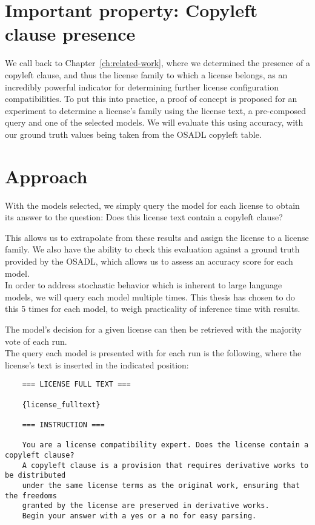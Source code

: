 \section{Important property: Copyleft clause presence}

We call back to Chapter~\ref{ch:related-work}, where we determined the presence of a copyleft clause, and thus the license family to which a license belongs, as an incredibly powerful indicator for determining further license configuration compatibilities. To put this into practice, a proof of concept is proposed for an experiment to determine a license's family using the license text, a pre-composed query and one of the selected models. We will evaluate this using accuracy, with our ground truth values being taken from the OSADL copyleft table.

\section{Approach}

With the models selected, we simply query the model for each license to obtain its answer to the question: Does this license text contain a copyleft clause?

This allows us to extrapolate from these results and assign the license to a license family. We also have the ability to check this evaluation against a ground truth provided by the OSADL, which allows us to assess an accuracy score for each model. \\

In order to address stochastic behavior which is inherent to large language models, we will query each model multiple times. This thesis has chosen to do this 5 times for each model, to weigh practicality of inference time with results.

The model's decision for a given license can then be retrieved with the majority vote of each run. \\

The query each model is presented with for each run is the following, where the license's text is inserted in the indicated position:

\begin{verbatim}
	=== LICENSE FULL TEXT ===
	
	{license_fulltext}
	
	=== INSTRUCTION ===
	
	You are a license compatibility expert. Does the license contain a copyleft clause?
	A copyleft clause is a provision that requires derivative works to be distributed
	under the same license terms as the original work, ensuring that the freedoms
	granted by the license are preserved in derivative works.
	Begin your answer with a yes or a no for easy parsing.
\end{verbatim}


